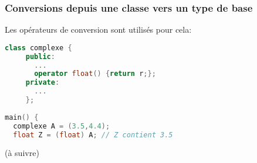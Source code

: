 \documentclass{beamer}
\begin{document}
\begin{frame}[fragile=singleslide,shrink=20]
\frametitle {Conversions depuis une classe vers un type de base}

Les opérateurs de conversion sont utilisés pour cela:
\begin{lstlisting}[language=c++]
class complexe {
     public:
       ...
       operator float() {return r;};
     private:
       ...
     };
     
main() {
  complexe A = (3.5,4.4);
  float Z = (float) A; // Z contient 3.5
\end{lstlisting}
\end{frame}

\begin{frame}
(à suivre)
\end{frame}
\end{document}

